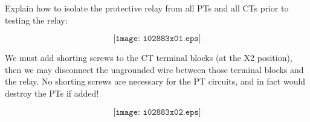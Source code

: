 

Explain how to isolate the protective relay from all PTs and all CTs prior to testing the relay:

$$\texttt{[image: i02883x01.eps]}$$








 






We must add shorting screws to the CT terminal blocks (at the X2 position), then we may disconnect the ungrounded wire between those terminal blocks and the relay.  No shorting screws are necessary for the PT circuits, and in fact would destroy the PTs if added!

$$\texttt{[image: i02883x02.eps]}$$




